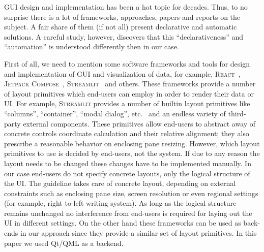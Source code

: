 
GUI design and implementation has been a hot topic for decades. Thus, to no surprise there is a lot of frameworks, approaches, papers
and reports on the subject. A fair share of them (if not all) present declarative and automatic solutions. A careful study, however,
discovers that this ``declarativeness'' and ``automation'' is understood differently then in our case.

First of all, we need to mention some software frameworks and tools for design and implementation of GUI and visualization of data, for example, \textsc{React}~\cite{react},
\textsc{Jetpack Compose}~\cite{Jetpack}, %
\textsc{Streamlit}~\cite{Streamlit}%
and others.
These frameworks provide a number of layout primitives which end-users can employ in order to render their data or UI. For example, \textsc{Streamlit}
provides a number of builtin layout primitives like ``columns'', ``container'', ``modal dialog'', etc.~\cite{StreamlitLayout} and an endless
variety of third-party external components. These primitives allow end-users to abstract away of concrete controls coordinate calculation and their
relative alignment; they also prescribe a reasonable behavior on enclosing pane resizing. However, which layout primitives to use is decided by
end-users, not the system. If due to any reason the layout needs to be changed these changes have to be implemented manually. In our case
end-users do not specify concrete layouts, only the logical structure of the UI. The guideline takes care of concrete layout, depending on
external constraints such as enclosing pane size, screen resolution or even regional settings (for example, right-to-left writing system). As long
as the logical structure remains unchanged no interference from end-users is required for laying out the UI in different settings. On the
other hand these frameworks can be used as back-ends in our approach since they provide a similar set of layout primitives.
In this paper we used Qt/QML as a backend.

